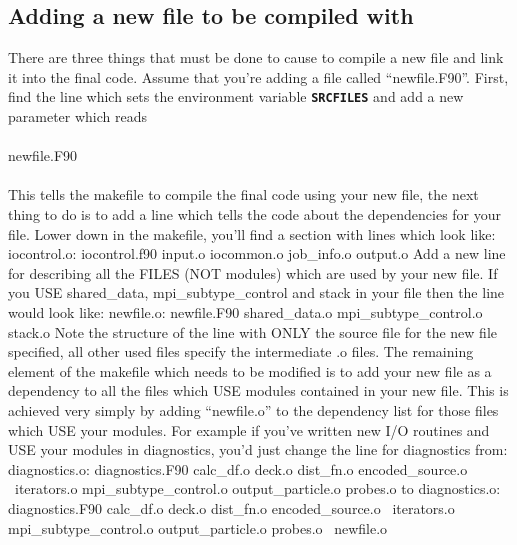 \documentclass[12pt,a4paper]{article}
\newcommand{\inlinecode}[1]{{\color{warwickred} \bf\texttt{#1}}}
\newcommand{\EPOCH}{{\color{warwickdark}\fontfamily{phv}\selectfont{EPOCH}}}
\newenvironment{boxverbatim}{\lboxverbatim{none}}{\endlboxverbatim}
\begin{document}
\subsection{Adding a new file to be compiled with {\EPOCH}}
There are three things that must be done to cause {\EPOCH} to compile a new
file and link it into the final code. Assume that you're adding a file called
``newfile.F90''. First, find the line which sets the environment variable
\inlinecode{SRCFILES} and add a new parameter which reads\\
\\
newfile.F90\\
\\ This tells the makefile to compile the final code using your new file, the
next thing to do is to add a line which tells the code about the dependencies
for your file. Lower down in the makefile, you'll find a section with lines
which look like:
\begin{boxverbatim}
iocontrol.o: iocontrol.f90 input.o iocommon.o job_info.o output.o
\end{boxverbatim}
Add a new line for describing all the FILES (NOT modules) which are used by
your new file. If you USE shared\_data, mpi\_subtype\_control and stack in
your file then the line would look like:
\begin{boxverbatim}
newfile.o: newfile.F90 shared_data.o mpi_subtype_control.o stack.o
\end{boxverbatim}
Note the structure of the line with ONLY the source file for the new file
specified, all other used files specify the intermediate .o files. The
remaining element of the makefile which needs to be modified is to add your
new file as a dependency to all the files which USE modules contained in your
new file. This is achieved very simply by adding ``newfile.o'' to the dependency
list for those files which USE your modules. For example if you've written new
I/O routines and USE your modules in diagnostics, you'd just change the line
for diagnostics from:
\begin{boxverbatim}
diagnostics.o: diagnostics.F90 calc_df.o deck.o dist_fn.o encoded_source.o \
  iterators.o mpi_subtype_control.o output_particle.o probes.o
\end{boxverbatim}
to
\begin{boxverbatim}
diagnostics.o: diagnostics.F90 calc_df.o deck.o dist_fn.o encoded_source.o \
  iterators.o mpi_subtype_control.o output_particle.o probes.o \
  newfile.o
\end{boxverbatim}
\end{document}

